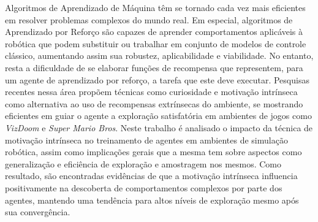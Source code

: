 
\begin{resumo} 
Algoritmos de Aprendizado de Máquina têm se tornado cada vez mais eficientes em resolver problemas complexos do mundo real. Em especial, algoritmos de Aprendizado por Reforço são capazes de aprender comportamentos aplicáveis à robótica que podem substituir ou trabalhar em conjunto de modelos de controle clássico, aumentando assim sua robustez, aplicabilidade e viabilidade. No entanto, resta a dificuldade de se elaborar funções de recompensa que representem, para um agente de aprendizado por reforço, a tarefa que este deve executar. Pesquisas recentes nessa área propõem técnicas como curiosidade e motivação intrínseca como alternativa ao uso de recompensas extrínsecas do ambiente, se mostrando eficientes em guiar o agente a exploração satisfatória em ambientes de jogos como \textit{VizDoom} e \textit{Super Mario Bros}. Neste trabalho é analisado o impacto da técnica de motivação intrínseca no treinamento de agentes em ambientes de simulação robótica, assim como implicações gerais que a mesma tem sobre aspectos como generalização e eficiência de exploração e amostragem nos mesmos. Como resultado, são encontradas evidências de que a motivação intrínseca influencia positivamente na descoberta de comportamentos complexos por parte dos agentes, mantendo uma tendência para altos níveis de exploração mesmo após sua convergência.

\end{resumo}

